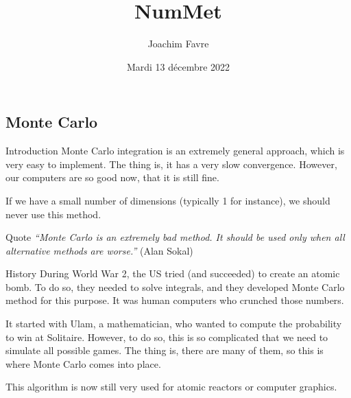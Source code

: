 \documentclass[a4paper]{article}
\title{NumMet}
\author{Joachim Favre}
\date{Mardi 13 décembre 2022}
\begin{document}
\maketitle


\subsection{Monte Carlo}

\begin{parag}{Introduction}
    Monte Carlo integration is an extremely general approach, which is very easy to implement. The thing is, it has a very slow convergence. However, our computers are so good now, that it is still fine.

    If we have a small number of dimensions (typically 1 for instance), we should never use this method.

    \begin{subparag}{Quote}
        \textit{``Monte Carlo is an extremely bad method. It should be used only when all alternative methods are worse.''} (Alan Sokal)
    \end{subparag}
\end{parag}

\begin{parag}{History}
    During World War 2, the US tried (and succeeded) to create an atomic bomb. To do so, they needed to solve integrals, and they developed Monte Carlo method for this purpose. It was human computers who crunched those numbers.

    It started with Ulam, a mathematician, who wanted to compute the probability to win at Solitaire. However, to do so, this is so complicated that we need to simulate all possible games. The thing is, there are many of them, so this is where Monte Carlo comes into place.

    This algorithm is now still very used for atomic reactors or computer graphics.
\end{parag}
\end{document}
